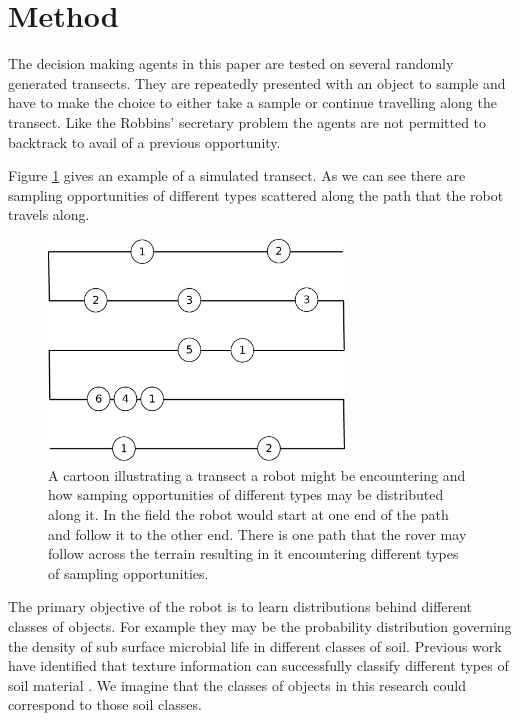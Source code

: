 \section{Method}
\label{sec:method}

The decision making agents in this paper are tested on several randomly
generated transects.  They are repeatedly presented with an object to sample
and have to make the choice to either take a sample or continue travelling
along the transect.  Like the Robbins' secretary problem the agents are not
permitted to backtrack to avail of a previous opportunity.


Figure \ref{fig:transect} gives an example of a simulated transect. As we can
see there are sampling opportunities of different types scattered along the
path that the robot travels along.  

\begin{figure}[htpd!]
	\centering 
	\includegraphics[width=0.7\textwidth]{transect}
	\caption{A cartoon illustrating a transect a robot might be encountering and how samping opportunities of different types may be distributed along it.  In the field the robot would start at one end of the path and follow it to the other end.  There is one path that the rover may follow across the terrain resulting in it encountering different types of sampling opportunities.}
	\label{fig:transect}
\end{figure}


The primary objective of the robot is to learn distributions behind different
classes of objects.  For example they may be the probability distribution
governing the density of sub surface microbial life in different classes of
soil.  Previous work have identified that texture information can successfully
classify different types of soil material \cite{dunlop2006automatic}.  
We imagine that the classes of objects in
this research could correspond to those soil classes.


